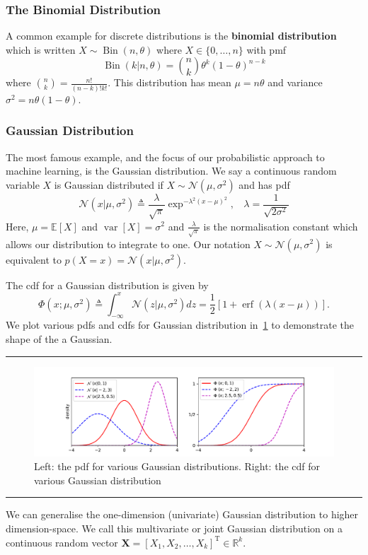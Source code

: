 \documentclass[10pt,a4paper]{article}
\DeclareMathOperator{\var}{var}
\DeclareMathOperator{\bin}{Bin}
\DeclareMathOperator{\erf}{erf}
\numberwithin{equation}{section}
\theoremstyle{plain}
\theoremstyle{definition}
\theoremstyle{own}
\begin{document}
\subsubsection{The Binomial Distribution}
A common example for discrete distributions is the \textbf{binomial distribution} which is written $X \sim \bin(n, \theta)$ where $X \in \{0, \ldots, n\}$ with pmf
\begin{equation}
\bin(k | n, \theta) = \binom{n}{k} \theta^k (1 - \theta)^{n - k}
\end{equation}
where $\binom{n}{k} = \frac{n!}{(n - k)!k!}$. This distribution has mean $\mu = n \theta$ and variance $\sigma^2 = n\theta (1 - \theta)$.
\subsubsection{Gaussian Distribution}
The most famous example, and the focus of our probabilistic approach to machine learning, is the Gaussian distribution. We say a continuous random variable $X$ is Gaussian distributed if $X \sim \mathcal{N}( \mu, \sigma^2)$ and has pdf
\begin{equation}
\mathcal{N}(x|\mu, \sigma^2) \triangleq \frac{\lambda}{\sqrt{\pi}}\exp^{-\lambda^2( x - \mu )^2},~~~~\lambda = \frac{1}{\sqrt{2\sigma^2}}
\end{equation}
Here, $\mu = \mathbb{E}[X]$ and $\var[X] = \sigma^2$ and $\frac{\lambda}{\sqrt{\pi}}$ is the normalisation constant which allows our distribution to integrate to one. Our notation $X \sim \mathcal{N}( \mu, \sigma^2)$ is equivalent to $p(X = x) = \mathcal{N}(x|\mu, \sigma^2)$.

The cdf for a Gaussian distribution is given by
\begin{equation}
\Phi(x; \mu, \sigma^2) \triangleq \int_{-\infty}^{x} \mathcal{N}(z|\mu, \sigma^2) dz = \frac{1}{2} \left[ 1 + \erf(\lambda(x - \mu)) \right].
\end{equation}
We plot various pdfs and cdfs for Gaussian distribution in~\cref{fig:1} to demonstrate the shape of the a Gaussian.
\vspace{5mm}
\hrule
\begin{figure}[H]
\centering
\includegraphics[width = 1.0\textwidth]{gaus_graf}
\caption{Left: the pdf for various Gaussian distributions. Right: the cdf for various Gaussian distribution}
\label{fig:1}
\end{figure}
\hrule
\vspace{5mm}
We can generalise the one-dimension (univariate) Gaussian distribution to higher dimension-space. We call this multivariate or joint Gaussian distribution on a continuous random vector $\mathbf{X} = \left[ X_1, X_2, \ldots, X_k \right]^{\text{T}} \in \mathbb{R}^{k}$.
\end{document}
